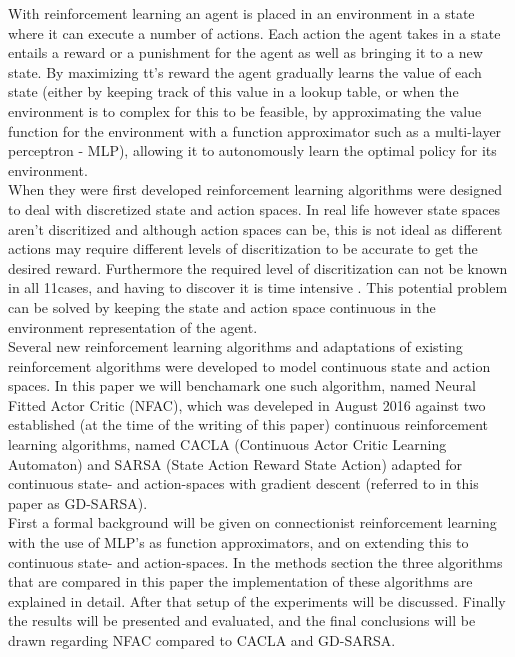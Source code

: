 With reinforcement learning an agent is placed in an environment in a state where it can execute a number of actions. Each
action the agent takes in a state entails a reward or a punishment for the agent as well as bringing it to a new state.
By maximizing tt's reward the agent gradually learns the value of each state (either by keeping track of this value in a
lookup table, or when the environment is to complex for this to be feasible, by approximating the value function for the
environment with a function approximator such as a multi-layer perceptron - MLP), allowing it to autonomously learn the optimal policy
for its environment. \\
When they were first developed reinforcement learning algorithms were designed to deal with discretized state and action
spaces. In real life however state spaces aren't discritized and although action spaces can be, this is not ideal as different
actions may require different levels of discritization to be accurate to get the desired reward. Furthermore the required level
of discritization can not be known in all 11cases, and having to discover it is time intensive \cite{van2007reinforcement}. %
This potential problem can be solved by keeping the state and action space continuous in the environment representation of the agent. \\
Several new reinforcement learning algorithms and adaptations of existing reinforcement algorithms were developed to model continuous
state and action spaces. In this paper we will benchamark one such algorithm, named Neural Fitted Actor Critic (NFAC), which was develeped in August 2016 \cite{zimmer2016neural}
against two established (at the time of the writing of this paper) continuous reinforcement learning algorithms, named CACLA (Continuous Actor Critic Learning Automaton)
\cite{van2007reinforcement}
and SARSA (State Action Reward State Action) adapted for continuous state- and action-spaces \cite{nichols2014application} with gradient descent (referred to in this paper as GD-SARSA). \\
First a formal background will be given on connectionist reinforcement learning with the use of MLP's as function approximators,
and on extending this to continuous state- and action-spaces. In the methods section the three algorithms that are compared
 in this paper the implementation of these algorithms are explained in detail. After that setup of the experiments will be discussed.
Finally the results will be presented and evaluated, and the final conclusions will be drawn regarding NFAC compared to CACLA and GD-SARSA.
